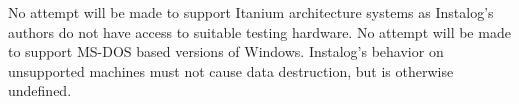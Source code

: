 No attempt will be made to support Itanium architecture systems as Instalog's
authors do not have access to suitable testing hardware. No attempt will be made
to support MS-DOS based versions of Windows. Instalog's behavior on unsupported
machines must not cause data destruction, but is otherwise undefined.